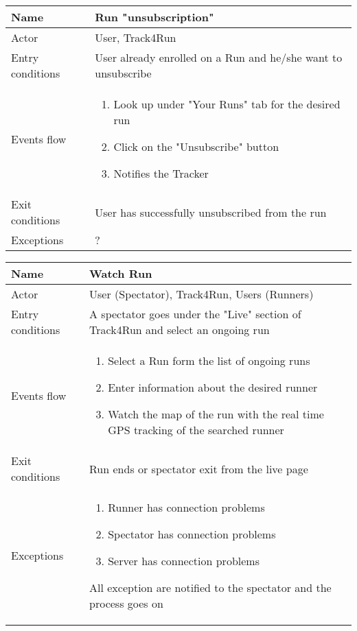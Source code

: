 \begin{table}[]
\begin{tabular}{|l|p{12cm}|}
\hline
Name             & Run "unsubscription" \\ \hline
Actor            & User, Track4Run \\ \hline
Entry conditions & User already enrolled on a Run and he/she want to unsubscribe \\ \hline
Events flow      & \begin{enumerate}
\item Look up under "Your Runs" tab for the desired run
\item Click on the "Unsubscribe" button
\item Notifies the Tracker
\end{enumerate} \\ \hline
Exit conditions  & User has successfully unsubscribed from the run \\ \hline
Exceptions       & ? \\ \hline
\end{tabular}
\end{table}

\begin{table}[]
\begin{tabular}{|l|p{12cm}|}
\hline
Name             & Watch Run \\ \hline
Actor            & User (Spectator), Track4Run, Users (Runners) \\ \hline
Entry conditions & A spectator goes under the "Live" section of Track4Run and select an ongoing run \\ \hline
Events flow      & \begin{enumerate}
\item Select a Run form the list of ongoing runs
\item Enter information about the desired runner
\item Watch the map of the run with the real time GPS tracking of the searched runner
\end{enumerate} \\ \hline
Exit conditions  & Run ends or spectator exit from the live page \\ \hline
Exceptions       & \begin{enumerate}
\item Runner has connection problems
\item Spectator has connection problems
\item Server has connection problems
\end{enumerate} All exception are notified to the spectator and the process goes on\\ \hline
\end{tabular}
\end{table}

